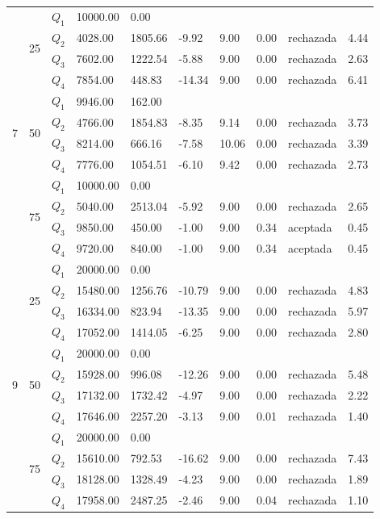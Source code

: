 \begin{table}[]
\begin{tabular}{|l|l|l|l|l|l|l|l|l|l|}
\multirow{12}{*}{7} & \multirow{4}{*}{25} & $Q_1$ & 10000.00 & 0.00 & \multicolumn{5}{l|}{} \\ \cline{3-10} 
 &  & $Q_2$ & 4028.00 & 1805.66 & -9.92 & 9.00 & 0.00 & rechazada & 4.44 \\ \cline{3-10} 
 &  & $Q_3$ & 7602.00 & 1222.54 & -5.88 & 9.00 & 0.00 & rechazada & 2.63 \\ \cline{3-10} 
 &  & $Q_4$ & 7854.00 & 448.83 & -14.34 & 9.00 & 0.00 & rechazada & 6.41 \\ \cline{2-10} 
 & \multirow{4}{*}{50} & $Q_1$ & 9946.00 & 162.00 & \multicolumn{5}{l|}{} \\ \cline{3-10} 
 &  & $Q_2$ & 4766.00 & 1854.83 & -8.35 & 9.14 & 0.00 & rechazada & 3.73 \\ \cline{3-10} 
 &  & $Q_3$ & 8214.00 & 666.16 & -7.58 & 10.06 & 0.00 & rechazada & 3.39 \\ \cline{3-10} 
 &  & $Q_4$ & 7776.00 & 1054.51 & -6.10 & 9.42 & 0.00 & rechazada & 2.73 \\ \cline{2-10} 
 & \multirow{4}{*}{75} & $Q_1$ & 10000.00 & 0.00 & \multicolumn{5}{l|}{} \\ \cline{3-10} 
 &  & $Q_2$ & 5040.00 & 2513.04 & -5.92 & 9.00 & 0.00 & rechazada & 2.65 \\ \cline{3-10} 
 &  & $Q_3$ & 9850.00 & 450.00 & -1.00 & 9.00 & 0.34 & aceptada & 0.45 \\ \cline{3-10} 
 &  & $Q_4$ & 9720.00 & 840.00 & -1.00 & 9.00 & 0.34 & aceptada & 0.45 \\ \hline
\multirow{12}{*}{9} & \multirow{4}{*}{25} & $Q_1$ & 20000.00 & 0.00 & \multicolumn{5}{l|}{} \\ \cline{3-10} 
 &  & $Q_2$ & 15480.00 & 1256.76 & -10.79 & 9.00 & 0.00 & rechazada & 4.83 \\ \cline{3-10} 
 &  & $Q_3$ & 16334.00 & 823.94 & -13.35 & 9.00 & 0.00 & rechazada & 5.97 \\ \cline{3-10} 
 &  & $Q_4$ & 17052.00 & 1414.05 & -6.25 & 9.00 & 0.00 & rechazada & 2.80 \\ \cline{2-10} 
 & \multirow{4}{*}{50} & $Q_1$ & 20000.00 & 0.00 & \multicolumn{5}{l|}{} \\ \cline{3-10} 
 &  & $Q_2$ & 15928.00 & 996.08 & -12.26 & 9.00 & 0.00 & rechazada & 5.48 \\ \cline{3-10} 
 &  & $Q_3$ & 17132.00 & 1732.42 & -4.97 & 9.00 & 0.00 & rechazada & 2.22 \\ \cline{3-10} 
 &  & $Q_4$ & 17646.00 & 2257.20 & -3.13 & 9.00 & 0.01 & rechazada & 1.40 \\ \cline{2-10} 
 & \multirow{4}{*}{75} & $Q_1$ & 20000.00 & 0.00 & \multicolumn{5}{l|}{} \\ \cline{3-10} 
 &  & $Q_2$ & 15610.00 & 792.53 & -16.62 & 9.00 & 0.00 & rechazada & 7.43 \\ \cline{3-10} 
 &  & $Q_3$ & 18128.00 & 1328.49 & -4.23 & 9.00 & 0.00 & rechazada & 1.89 \\ \cline{3-10} 
 &  & $Q_4$ & 17958.00 & 2487.25 & -2.46 & 9.00 & 0.04 & rechazada & 1.10 \\ \hline
\end{tabular}
\end{table}

